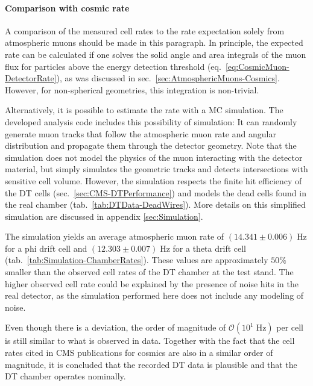 \paragraph{Comparison with cosmic rate} A comparison of the measured cell rates to the rate expectation solely from atmospheric muons should be made in this paragraph. In principle, the expected rate can be calculated if one solves the solid angle and area integrals of the muon flux for particles above the energy detection threshold (eq.\ \ref{eq:CosmicMuon-DetectorRate}), as was discussed in sec.\ \ref{sec:AtmosphericMuons-Cosmics}. However, for non-spherical geometries, this integration is non-trivial.
\par Alternatively, it is possible to estimate the rate with a \ac{MC} simulation. The developed analysis code includes this possibility of simulation: It can randomly generate muon tracks that follow the atmospheric muon rate and angular distribution and propagate them through the detector geometry. Note that the simulation does not model the physics of the muon interacting with the detector material, but simply simulates the geometric tracks and detects intersections with sensitive cell volume. However, the simulation respects the finite hit efficiency of the \ac{DT} cells (sec.\ \ref{sec:CMS-DTPerformance}) and models the dead cells found in the real chamber (tab.\ \ref{tab:DTData-DeadWires}). More details on this simplified simulation are discussed in appendix \ref{sec:Simulation}.
\par The simulation yields an average atmospheric muon rate of $(14.341 \pm 0.006)\;\si{\hertz}$ for a phi drift cell and $(12.303 \pm 0.007)\;\si{\hertz}$ for a theta drift cell (tab.\ \ref{tab:Simulation-ChamberRates}). These values are approximately $50\%$ smaller than the observed cell rates of the \ac{DT} chamber at the test stand. The higher observed cell rate could be explained by the presence of noise hits in the real detector, as the simulation performed here does not include any modeling of noise.
\par Even though there is a deviation, the order of magnitude of $\mathcal{O}(10^1\;\si{\hertz})$ per cell is still similar to what is observed in data. Together with the fact that the cell rates cited in \ac{CMS} publications for cosmics are also in a similar order of magnitude, it is concluded that the recorded \ac{DT} data is plausible and that the \ac{DT} chamber operates nominally.

